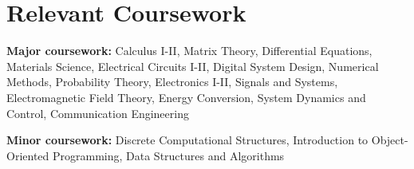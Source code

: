 \documentclass[letterpaper,11pt]{article}
\makeatletter
\newcommand{\resumeOrganizationHeading}[4]{
  \vspace{-2pt}\item
    \begin{tabular*}{0.97\textwidth}[t]{l@{\extracolsep{\fill}}r}
      \textbf{#1} & \textit{\small #2} \\
      \textit{\small#3}
    \end{tabular*}\vspace{-7pt}
}
\newcommand{\resumeSubHeadingListStart}{\begin{itemize}[leftmargin=0.15in, label={}]}
\newcommand{\resumeSubHeadingListEnd}{\end{itemize}}
\makeatother
\begin{document}
\section{Relevant Coursework}
  \vspace{2pt}
  \resumeSubHeadingListStart
    \small{\item{
        \textbf{Major coursework:} {Calculus I-II, Matrix Theory, Differential Equations, Materials Science, Electrical Circuits I-II, Digital System Design, Numerical Methods, Probability Theory, Electronics I-II, Signals and Systems, Electromagnetic Field Theory, Energy Conversion, System Dynamics and Control, Communication Engineering} \\ \vspace{3pt}

        \textbf{Minor coursework:} {Discrete Computational Structures, Introduction to Object-Oriented Programming, Data Structures and Algorithms}
    }}
  \resumeSubHeadingListEnd
























\end{document}
